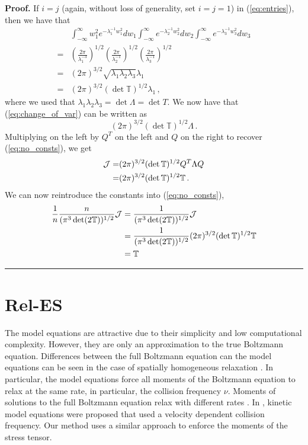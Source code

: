 \documentclass[12pt]{CSUNthesis}
\def\T{\mathbb{T}}
\newenvironment{proof}[1][Proof]{\noindent\textbf{#1.} }{\newline \hspace*{\textwidth}\hspace*{-0,4cm} \rule{0.5em}{0.5em} \vspace{0,2cm}}
\def\T{\mathbb{T}}
\begin{document}
\begin{proof}
If $i=j$ (again, without loss of generality, set $i=j=1$) in (\ref{eq:entries}), then we have that
\begin{align}
&\int_{-\infty}^{\infty} w_1^2 e^{-\lambda_1^{-1}w_1^2} dw_1 \int_{-\infty}^{\infty} e^{-\lambda_2^{-1}w_2^2} dw_2 \int_{-\infty}^{\infty} e^{-\lambda_3^{-1}w_3^2} dw_3 \nonumber \\
= &\left(\frac{2{\pi}}{\lambda_1^{-3}} \right)^{1/2} \left(\frac{2{\pi}}{{\lambda_2^{-1}}} \right)^{1/2} \left(\frac{2{\pi}}{{\lambda_3^{-1}}} \right)^{1/2} \nonumber\\
= & (2 \pi)^{3/2} \sqrt{\lambda_1 \lambda_2 \lambda_3} \lambda_1 \nonumber\\
= & (2 \pi)^{3/2} (\det \T)^{1/2} \lambda_1 \, ,
\end{align}
where we used that $\lambda_1 \lambda_2 \lambda_3 = \det \Lambda = \det T$. We now have that (\ref{eq:change_of_var}) can be written as
\begin{equation}
(2 \pi)^{3/2} (\det \T)^{1/2} \Lambda \, .
\end{equation}
Multiplying on the left by $Q^T$ on the left and $Q$ on the right to recover (\ref{eq:no_consts}), we get
\begin{align}
\cal{J} = & (2 \pi)^{3/2} (\det \T)^{1/2} Q^T \Lambda Q \nonumber\\
= & (2 \pi)^{3/2} (\det \T)^{1/2} \T \, .
\end{align}
We can now reintroduce the constants into (\ref{eq:no_consts}),
\begin{align*}
\frac{1}{n} \frac{n}{(\pi^3 \det(2\T))^{1/2}} \cal{J} &= \frac{1}{(\pi^3 \det(2\T))^{1/2}} \cal{J}\\
&= \frac{1}{(\pi^3 \det(2\T))^{1/2}} (2 \pi)^{3/2} (\det \T)^{1/2} \T \\
&= \T
\end{align*}
\end{proof}

\section{Rel-ES}
The model equations are attractive due to their simplicity and low computational complexity. However, they are only an approximation to the true Boltzmann equation. Differences between the full Boltzmann equation can the model equations can be seen in the case of spatially homogeneous relaxation \cite{AlekseenkoEuler2015}. In particular, the model equations force all moments of the Boltzmann equation to relax at the same rate, in particular, the collision frequency $\nu$. Moments of solutions to the full Boltzmann equation relax with different rates \cite{Cercignani1969, StruchtrupHenning1997}. In \cite{AlekseenkoEuler2015}, kinetic model equations were proposed that used a velocity dependent collision frequency. Our method uses a similar approach to enforce the moments of the stress tensor.
\end{document}
